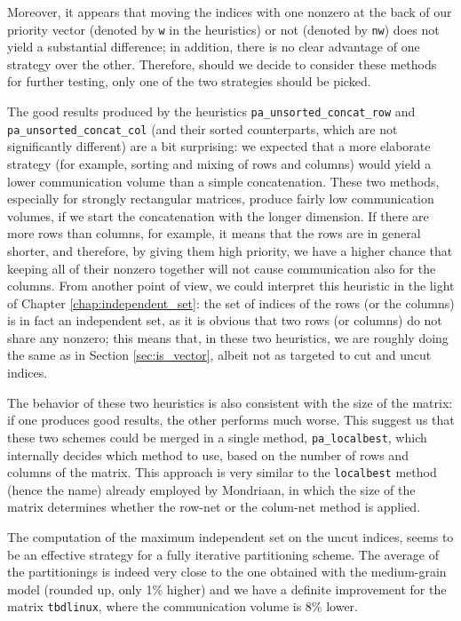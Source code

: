 Moreover, it appears that moving the indices with one nonzero at the back of our priority vector (denoted by \verb|w| in the heuristics) or not (denoted by \verb|nw|) does not yield a substantial difference; in addition, there is no clear advantage of one strategy over the other. Therefore, should we decide to consider these methods for further testing, only one of the two strategies should be picked.

The good results produced by the heuristics \verb|pa_unsorted_concat_row| and \verb|pa_unsorted_concat_col| (and their sorted counterparts, which are not significantly different) are a bit surprising: we expected that a more elaborate strategy (for example, sorting and mixing of rows and columns) would yield a lower communication volume than a simple concatenation. These two methods, especially for strongly rectangular matrices, produce fairly low communication volumes, if we start the concatenation with the longer dimension. If there are more rows than columns, for example, it means that the rows are in general shorter, and therefore, by giving them high priority, we have a higher chance that keeping all of their nonzero together will not cause communication also for the columns. From another point of view, we could interpret this heuristic in the light of Chapter \ref{chap:independent_set}: the set of indices of the rows (or the columns) is in fact an independent set, as it is obvious that two rows (or columns) do not share any nonzero; this means that, in these two heuristics, we are roughly doing the same as in Section \ref{sec:is_vector}, albeit not as targeted to cut and uncut indices. 

The behavior of these two heuristics is also consistent with the size of the matrix: if one produces good results, the other performs much worse. This suggest us that these two schemes could be merged in a single method, \verb|pa_localbest|, which internally decides which method to use, based on the number of rows and columns of the matrix. This approach is very similar to the \verb|localbest| method (hence the name) already employed by Mondriaan, in which the size of the matrix determines whether the row-net or the colum-net method is applied.

The computation of the maximum independent set on the uncut indices, seems to be an effective strategy for a fully iterative partitioning scheme. The average of the partitionings is indeed very close to the one obtained with the medium-grain model (rounded up, only 1\% higher) and we have a definite improvement for the matrix \verb|tbdlinux|, where the communication volume is 8\% lower.

